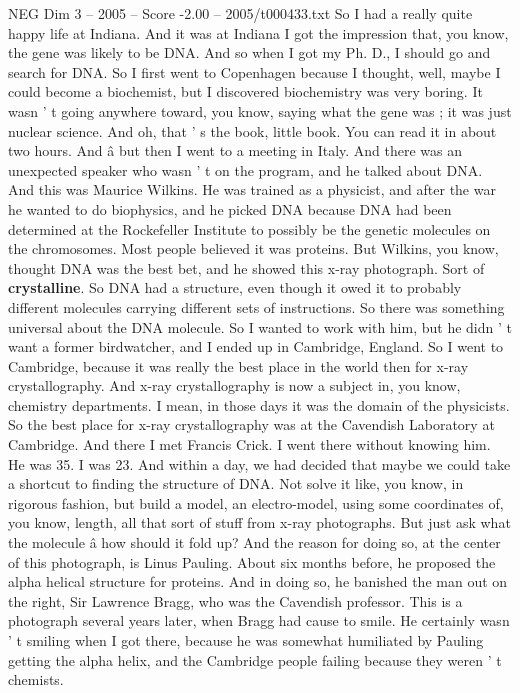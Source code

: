 \begin{textsample}{NEG Dim 3 – 2005 – Score -2.00 – 2005/t000433.txt}
So I had a really quite happy life at Indiana.
And it was at Indiana I got the impression that, you know, the gene was likely to be DNA.
And so when I got my Ph.
D., I should go and search for DNA.
So I first went to Copenhagen because I thought, well, maybe I could become a biochemist, but I discovered biochemistry was very boring.
It wasn ' t going anywhere toward, you know, saying what the gene was ; it was just nuclear science.
And oh, that ' s the book, little book.
You can read it in about two hours.
And â but then I went to a meeting in Italy.
And there was an unexpected speaker who wasn ' t on the program, and he talked about DNA.
And this was Maurice Wilkins.
He was trained as a physicist, and after the war he wanted to do biophysics, and he picked DNA because DNA had been determined at the Rockefeller Institute to possibly be the genetic molecules on the chromosomes.
Most people believed it was proteins.
But Wilkins, you know, thought DNA was the best bet, and he showed this x-ray photograph.
Sort of \textbf{crystalline}.
So DNA had a structure, even though it owed it to probably different molecules carrying different sets of instructions.
So there was something universal about the DNA molecule.
So I wanted to work with him, but he didn ' t want a former birdwatcher, and I ended up in Cambridge, England.
So I went to Cambridge, because it was really the best place in the world then for x-ray crystallography.
And x-ray crystallography is now a subject in, you know, chemistry departments.
I mean, in those days it was the domain of the physicists.
So the best place for x-ray crystallography was at the Cavendish Laboratory at Cambridge.
And there I met Francis Crick.
I went there without knowing him.
He was 35.
I was 23.
And within a day, we had decided that maybe we could take a shortcut to finding the structure of DNA.
Not solve it like, you know, in rigorous fashion, but build a model, an electro-model, using some coordinates of, you know, length, all that sort of stuff from x-ray photographs.
But just ask what the molecule â how should it fold up?
And the reason for doing so, at the center of this photograph, is Linus Pauling.
About six months before, he proposed the alpha helical structure for proteins.
And in doing so, he banished the man out on the right, Sir Lawrence Bragg, who was the Cavendish professor.
This is a photograph several years later, when Bragg had cause to smile.
He certainly wasn ' t smiling when I got there, because he was somewhat humiliated by Pauling getting the alpha helix, and the Cambridge people failing because they weren ' t chemists.

\end{textsample}
